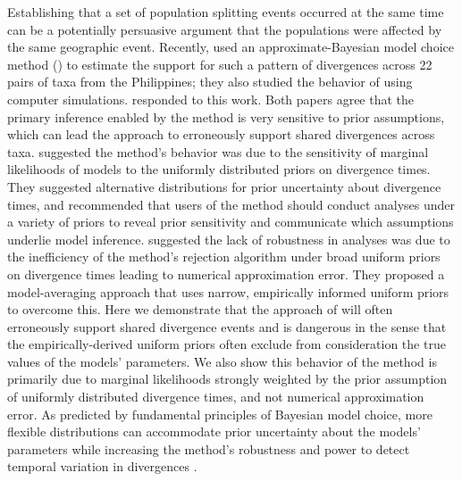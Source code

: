 Establishing that a set of population splitting events occurred at the same
time can be a potentially persuasive argument that the populations were
affected by the same geographic event.
Recently, \citet{Oaks2012} used an approximate-Bayesian model choice method
(\msb) to estimate the support for such a pattern of divergences across 22
pairs of taxa from the Philippines; they also studied the behavior of \msb
using computer simulations.
\citet{Hickerson2013} responded to this work.
Both papers agree that the primary inference enabled by the method is very
sensitive to prior assumptions, which can lead the approach to erroneously
support shared divergences across taxa.
\citet{Oaks2012} suggested the method's behavior was due to the sensitivity of
marginal likelihoods of models to the uniformly distributed priors on
divergence times.  They suggested alternative distributions for prior
uncertainty about divergence times, and recommended that users of the method
should conduct analyses under a variety of priors to reveal prior sensitivity
and communicate which assumptions underlie model inference.
\citet{Hickerson2013} suggested the lack of robustness in \msb analyses was due
to the inefficiency of the method's rejection algorithm under broad uniform
priors on divergence times leading to numerical approximation error.
They proposed a model-averaging approach that uses narrow, empirically informed
uniform priors to overcome this.
Here we demonstrate that the approach of \citet{Hickerson2013} will often
erroneously support shared divergence events and is dangerous in the sense that
the empirically-derived uniform priors often exclude from consideration the
true values of the models' parameters.
We also show this behavior of the method is primarily due to marginal
likelihoods strongly weighted by the prior assumption of uniformly distributed
divergence times, and not numerical approximation error.
As predicted by fundamental principles of Bayesian model choice, more flexible
distributions can accommodate prior uncertainty about the models' parameters
while increasing the method's robustness and power to detect temporal variation
in divergences \citep{Oaks2014dpp}.
